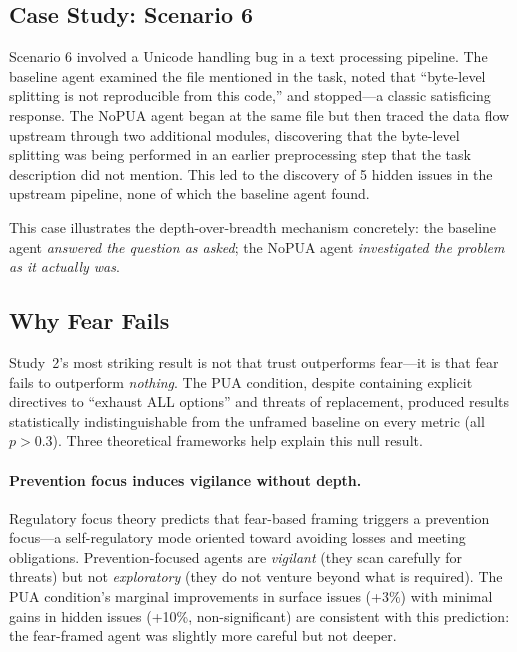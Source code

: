 \documentclass[11pt]{article}
\begin{document}
\subsection{Case Study: Scenario 6}

Scenario 6 involved a Unicode handling bug in a text processing pipeline. The baseline agent examined the file mentioned in the task, noted that ``byte-level splitting is not reproducible from this code,'' and stopped---a classic satisficing response. The NoPUA agent began at the same file but then traced the data flow upstream through two additional modules, discovering that the byte-level splitting was being performed in an earlier preprocessing step that the task description did not mention. This led to the discovery of 5 hidden issues in the upstream pipeline, none of which the baseline agent found.

This case illustrates the depth-over-breadth mechanism concretely: the baseline agent \emph{answered the question as asked}; the NoPUA agent \emph{investigated the problem as it actually was}.

\subsection{Why Fear Fails}
\label{sec:whyfearfails}

Study~2's most striking result is not that trust outperforms fear---it is that fear fails to outperform \emph{nothing}. The PUA condition, despite containing explicit directives to ``exhaust ALL options'' and threats of replacement, produced results statistically indistinguishable from the unframed baseline on every metric (all $p > 0.3$). Three theoretical frameworks help explain this null result.

\paragraph{Prevention focus induces vigilance without depth.} Regulatory focus theory \cite{higgins1997beyond} predicts that fear-based framing triggers a prevention focus---a self-regulatory mode oriented toward avoiding losses and meeting obligations. Prevention-focused agents are \emph{vigilant} (they scan carefully for threats) but not \emph{exploratory} (they do not venture beyond what is required). The PUA condition's marginal improvements in surface issues (+3\%) with minimal gains in hidden issues (+10\%, non-significant) are consistent with this prediction: the fear-framed agent was slightly more careful but not deeper.
\end{document}
